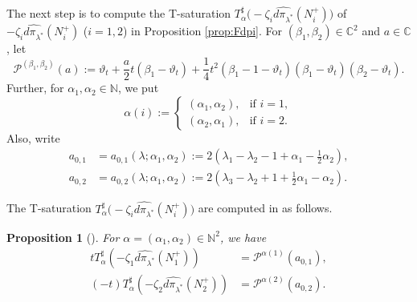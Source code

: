 \documentclass[a4paper,11pt,reqno]{amsart}
\newcommand{\CC}{\mathbb{C}}
\newcommand{\NN}{\mathbb{N}}
\newcommand{\calP}{\mathcal{P}}
\newcommand{\0}{{\bf 0}}
\newcommand{\1}{{\bf 1}}
\theoremstyle{plain}
\newtheorem{proposition}[equation]{Proposition}
\theoremstyle{definition}
\numberwithin{equation}{section}
\theoremstyle{definition}
\begin{document}
The next step is to compute the T-saturation
$T_\alpha^\sharp \big(-\zeta_i\widehat{d\pi_{\lambda^*}}(N_i^+)\big)$
of $-\zeta_i\widehat{d\pi_{\lambda^*}}(N_i^+)$ ($i=1,2$)  in 
Proposition \ref{prop:Fdpi}.
For $(\beta_1,\beta_2) \in \CC^2$ and $a\in \CC$, let
\begin{equation}\label{eqn:Palpha}
\calP^{(\beta_1,\beta_2)}(a) :=\vartheta_t+\frac{a}{2}t(\beta_1-\vartheta_t)+\frac{1}{4}t^2(\beta_1-1-\vartheta_t)(\beta_1-\vartheta_t)(\beta_2-\vartheta_t).
\end{equation}
Further, for $\alpha_1, \alpha_2 \in \NN$,  we put
\begin{equation*}
    \alpha(i):=
    \begin{cases}
        (\alpha_1,\alpha_2), &\text{if $i=1$},\\
        (\alpha_2,\alpha_1), & \text{if $i=2$}.
    \end{cases}
\end{equation*}
Also, write
\begin{equation}\label{eqn:a012}
\begin{aligned}
a_{0,1}
&=a_{0,1}(\lambda;\alpha_1,\alpha_2)
:=2(\lambda_1-\lambda_2-1+\alpha_1-\tfrac{1}{2}\alpha_2),
\\
a_{0,2}
&=a_{0,2}(\lambda;\alpha_1,\alpha_2)
:= 2(\lambda_3-\lambda_2+1+\tfrac{1}{2}\alpha_1-\alpha_2).
\end{aligned}
\end{equation}

The T-saturation 
$T_\alpha^\sharp \big(-\zeta_i\widehat{d\pi_{\lambda^*}}(N_i^+)\big)$
are computed in \cite[Prop.\ 5.13]{KPV25} as follows.


\begin{proposition}[{\cite[Prop.\ 5.13]{KPV25}}]
\label{prop:pihat12}
For $\alpha=(\alpha_1,\alpha_2) \in \NN^2$,
we have
\begin{align}
tT_\alpha^\sharp(-\zeta_1\widehat{d\pi_{\lambda^*}}(N_1^+))
&=\calP^{\alpha(1)}(a_{0,1}),\label{eqn:P1}\\[3pt]
(-t)T_\alpha^\sharp(-\zeta_2\widehat{d\pi_{\lambda^*}}(N_2^+))
&=\calP^{\alpha(2)}(a_{0,2}).\label{eqn:P2}
\end{align}
\end{proposition}
\end{document}
